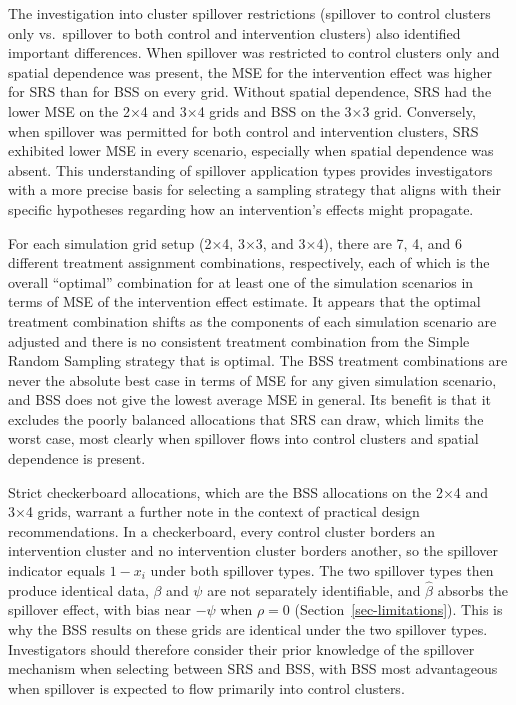 \documentclass[
  12pt,
  prelim]{bios-prelim}
\begin{document}
The investigation into cluster spillover restrictions (spillover to
control clusters only vs.~spillover to both control and intervention
clusters) also identified important differences. When spillover was
restricted to control clusters only and spatial dependence was present,
the MSE for the intervention effect was higher for SRS than for BSS on
every grid. Without spatial dependence, SRS had the lower MSE on the 2×4
and 3×4 grids and BSS on the 3×3 grid. Conversely, when spillover was
permitted for both control and intervention clusters, SRS exhibited
lower MSE in every scenario, especially when spatial dependence was
absent. This understanding of spillover application types provides
investigators with a more precise basis for selecting a sampling
strategy that aligns with their specific hypotheses regarding how an
intervention's effects might propagate.

For each simulation grid setup (2×4, 3×3, and 3×4), there are 7, 4, and
6 different treatment assignment combinations, respectively, each of
which is the overall ``optimal'' combination for at least one of the
simulation scenarios in terms of MSE of the intervention effect
estimate. It appears that the optimal treatment combination shifts as
the components of each simulation scenario are adjusted and there is no
consistent treatment combination from the Simple Random Sampling
strategy that is optimal. The BSS treatment combinations are never the
absolute best case in terms of MSE for any given simulation scenario,
and BSS does not give the lowest average MSE in general. Its benefit is
that it excludes the poorly balanced allocations that SRS can draw,
which limits the worst case, most clearly when spillover flows into
control clusters and spatial dependence is present.

Strict checkerboard allocations, which are the BSS allocations on the
2×4 and 3×4 grids, warrant a further note in the context of practical
design recommendations. In a checkerboard, every control cluster borders
an intervention cluster and no intervention cluster borders another, so
the spillover indicator equals \(1 - x_i\) under both spillover types.
The two spillover types then produce identical data, \(\beta\) and
\(\psi\) are not separately identifiable, and \(\hat{\beta}\) absorbs
the spillover effect, with bias near \(-\psi\) when \(\rho = 0\)
(Section~\ref{sec-limitations}). This is why the BSS results on these
grids are identical under the two spillover types. Investigators should
therefore consider their prior knowledge of the spillover mechanism when
selecting between SRS and BSS, with BSS most advantageous when spillover
is expected to flow primarily into control clusters.
\end{document}
